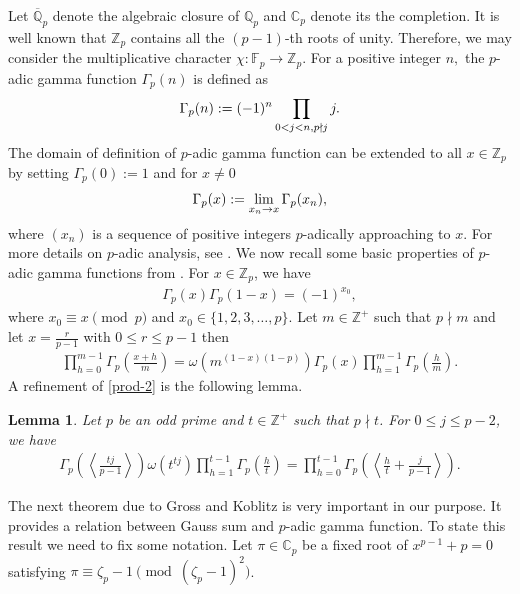 \documentclass[12pt]{amsart}
\theoremstyle{plain}
\newtheorem{lemma}[theorem]{Lemma}
\theoremstyle{definition}
\theoremstyle{remark}
\newcommand{\Z}{\mathbb{Z}}
\numberwithin{equation}{section}
\begin{document}
Let $\overline{\mathbb{Q}}_p$ denote the algebraic closure of $\mathbb{Q}_p$ and $\mathbb{C}_p$ denote its the completion. It is well known that $\Z_p$ contains all the $(p-1)$-th roots of unity. Therefore, we may consider the multiplicative character $\chi:\mathbb{F}_p\rightarrow \mathbb{Z}_p.$  For a positive integer $n,$ the $p$-adic gamma function $\Gamma_p(n)$ is defined as
\begin{align}
\Gamma_p(n):=(-1)^n\prod\limits_{0<j<n,p\nmid j}j.\notag
\end{align}
The domain of definition of $p$-adic gamma function can be extended to all $x\in\mathbb{Z}_p$ by setting $\Gamma_p(0):=1$ and for $x\neq0$
\begin{align}
\Gamma_p(x):=\lim_{x_n\rightarrow x}\Gamma_p(x_n),\notag
\end{align}
where $(x_n)$ is a sequence of positive integers $p$-adically approaching to $x.$
For more details on $p$-adic analysis, see \cite{kob}. We now recall some basic properties of $p$-adic gamma functions from \cite{kob}.
For $x\in \mathbb{Z}_p$, we have 
\begin{align}\label{prod-1}
    \Gamma_p(x)\Gamma_p(1-x)=(-1)^{x_0},
\end{align}
where $x_0 \equiv x \pmod{p}$ and $ x_0\in\{1,2,3,\ldots ,p\}.$ Let $m\in \mathbb{Z}^+$ such that $p\nmid m$ and let $x=\frac{r}{p-1}$ with $0\leq r \leq p-1$ then 
\begin{align}\label{prod-2}
   \prod\limits_{h=0}^{m-1} \Gamma_p\left(\frac{x+h}{m}\right)=\omega(m^{(1-x)(1-p)})\Gamma_p(x)\prod\limits_{h=1}^{m-1}\Gamma_p\left(\frac{h}{m}\right).
\end{align}	
A refinement of \eqref{prod-2} is the following lemma.
\begin{lemma}\cite[Lemma 4.1]{McCarthyPJM} Let $p$ be an odd prime and $t\in \mathbb{Z}^+$ such that $p \nmid t$. For $0\leq j \leq p-2$, we have 
\begin{align}\label{prod-3}
   \Gamma_p\left(\left\langle\frac{tj}{p-1}\right\rangle\right)\omega(t^{tj}) \prod\limits_{h=1}^{t-1}\Gamma_p\left(\frac{h}{t}\right)=\prod\limits_{h=0}^{t-1}\Gamma_p\left(\left\langle\frac{h}{t}+\frac{j}{p-1}\right\rangle\right).
\end{align}
\end{lemma}

The next theorem due to Gross and Koblitz \cite{gross} is very important in our purpose. It provides a relation between Gauss sum and $p$-adic gamma function. To state this result we need to fix some notation. 
Let $\pi\in\mathbb{C}_p$ be a fixed root of $x^{p-1}+p=0$ satisfying $\pi \equiv \zeta_p-1\pmod{(\zeta_p-1)^2}$. 
\end{document}
